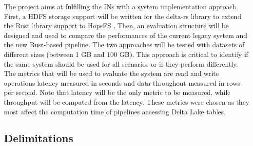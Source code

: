 The project aims at fulfilling the \glspl{IN} with a system implementation approach. First, a \gls{HDFS} storage support will be written for the delta-rs library to extend the Rust library support to \gls{HopsFS} \cite{niaziHopsFSScalingHierarchical2017}. Then, an evaluation structure will be designed and used to compare the performances of the current legacy system and the new Rust-based pipeline. The two approaches will be tested with datasets of different sizes (between 1 GB and 100 GB). This approach is critical to identify if the same system should be used for all scenarios or if they perform differently. The metrics that will be used to evaluate the system are read and write operations latency measured in seconds and data throughout measured in rows per second. Note that latency will be the only metric to be measured, while throughput will be computed from the latency. These metrics were chosen as they most affect the computation time of pipelines accessing Delta Lake tables.

\subsection{Delimitations}
    \label{subsec:delimitations}
    